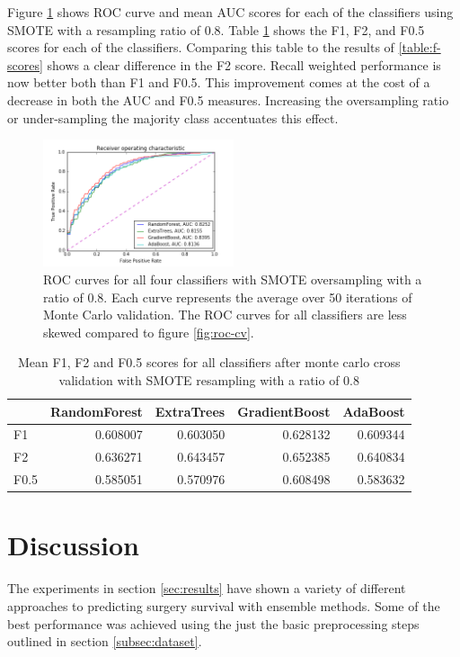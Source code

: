 \documentclass[journal]{IEEEtran}
\begin{document}
Figure \ref{fig:roc-smote} shows ROC curve and mean AUC scores for each of the classifiers using SMOTE with a resampling ratio of 0.8. Table \ref{table:f-score-smote} shows the F1, F2, and F0.5 scores for each of the classifiers. Comparing this table to the results of \ref{table:f-scores} shows a clear difference in the F2 score. Recall weighted performance is now better both than F1 and F0.5. This improvement comes at the cost of a decrease in both the AUC and F0.5 measures. Increasing the oversampling ratio or under-sampling the majority class accentuates this effect.

\begin{figure}[!t]
\centering
\includegraphics[width=0.5\textwidth]{../src/img/roc_smote.png}
\caption{ROC curves for all four classifiers with SMOTE oversampling with a ratio of 0.8. Each curve represents the average over 50 iterations of Monte Carlo validation. The ROC curves for all classifiers are less skewed compared to figure \ref{fig:roc-cv}.}
\label{fig:roc-smote}
\end{figure}

\begin{table}
\caption{Mean F1, F2 and F0.5 scores for all classifiers after monte carlo cross validation with SMOTE resampling with a ratio of 0.8}

\begin{tabular}{lrrrr}
{} &  RandomForest &  ExtraTrees &  GradientBoost &  AdaBoost \\
\hline
F1   &      0.608007 &    0.603050 &       0.628132 &  0.609344 \\
F2   &      0.636271 &    0.643457 &       0.652385 &  0.640834 \\
F0.5 &      0.585051 &    0.570976 &       0.608498 &  0.583632 \\
\end{tabular}

\label{table:f-score-smote}
\end{table}

\section{Discussion}
\label{sec:discussion}
The experiments in section \ref{sec:results} have shown a variety of different approaches to predicting surgery survival with ensemble methods. Some of the best performance was achieved using the just the basic preprocessing steps outlined in section \ref{subsec:dataset}.
\end{document}
